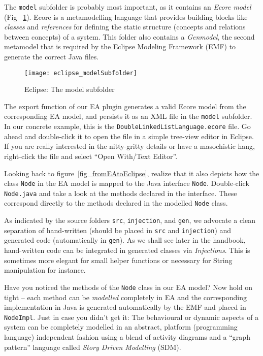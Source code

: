 The  \texttt{model} subfolder is probably most important, as it contains an  \emph{Ecore model} (Fig ~\ref{fig_modelSubfolder}). Ecore is a metamodelling
language that provides building  blocks like \emph{classes} and \emph{references} for defining the  static structure (concepts and relations between concepts)
of a system. This folder also contains a \emph{Genmodel}, the second metamodel that is required by the Eclipse Modeling Framework (EMF) to generate the correct
Java files.

\begin{figure}[htbp]
	\centering
  \texttt{[image: eclipse\_modelSubfolder]}
	\caption{Eclipse: The model subfolder}
	\label{fig_modelSubfolder}
\end{figure}

The  export function of our EA plugin generates a valid Ecore model from the  corresponding EA model, and persists it as an XML file in the \texttt{model}
subfolder. In our concrete example, this is the \texttt{DoubleLinkedListLanguage.ecore} file. Go ahead and double-click it to open the file in a simple
tree-view editor in Eclipse. If you are really interested in the nitty-gritty details or have a masochistic hang, right-click the file and select ``Open
With/Text Editor''.

Looking back to figure~\ref{fig_fromEAtoEclipse}, realize that it also depicts how the class \texttt{Node} in the EA model is mapped to the Java interface
\texttt{Node}. Double-click \texttt{Node.java} and take a look at the methods declared in the interface. These correspond directly to the methods declared in
the modelled \texttt{Node} class.

As indicated by the source folders \texttt{src}, \texttt{injection}, and \texttt{gen}, we advocate a clean separation of hand-written (should be placed in
\texttt{src} and \texttt{injection}) and generated code (automatically in \texttt{gen}). As we shall see later in the handbook, hand-written code can be
integrated in generated classes via \emph{Injections}.
This is sometimes more elegant for small helper functions or necessary for String manipulation for instance.

Have you noticed the methods of the \texttt{Node} class in our EA model?  Now hold on tight -- each method can be \emph{modelled} completely in EA and the
corresponding implementation in Java is generated automatically by the EMF and placed in \texttt{NodeImpl}.
Just in case you didn't get it: The behavioural or dynamic aspects of a system can be completely modelled in an abstract, platform (programming language)
independent fashion using a blend of activity  diagrams and a ``graph pattern'' language called \textit{Story Driven Modelling} (SDM).

